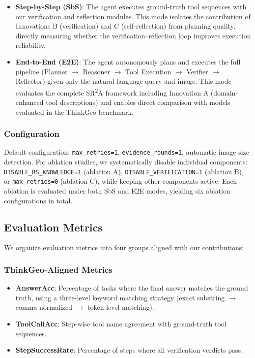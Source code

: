 \documentclass[journal]{IEEEtran}
\begin{document}
\begin{itemize}[leftmargin=*]
    \item \textbf{Step-by-Step (SbS)}: The agent executes ground-truth tool sequences with our verification and reflection modules. This mode isolates the contribution of Innovations B (verification) and C (self-reflection) from planning quality, directly measuring whether the verification--reflection loop improves execution reliability.
    \item \textbf{End-to-End (E2E)}: The agent autonomously plans and executes the full pipeline (Planner $\rightarrow$ Reasoner $\rightarrow$ Tool Execution $\rightarrow$ Verifier $\rightarrow$ Reflector) given only the natural language query and image. This mode evaluates the complete SR\textsuperscript{2}A framework including Innovation A (domain-enhanced tool descriptions) and enables direct comparison with models evaluated in the ThinkGeo benchmark.
\end{itemize}

\subsubsection{Configuration}
Default configuration: \texttt{max\_retries=1}, \texttt{evidence\_rounds=1}, automatic image size detection.
For ablation studies, we systematically disable individual components: \texttt{DISABLE\_RS\_KNOWLEDGE=1} (ablation A), \texttt{DISABLE\_VERIFICATION=1} (ablation B), or \texttt{max\_retries=0} (ablation C), while keeping other components active.
Each ablation is evaluated under both SbS and E2E modes, yielding six ablation configurations in total.

\subsection{Evaluation Metrics}
\label{subsec:metrics}

We organize evaluation metrics into four groups aligned with our contributions:

\subsubsection{ThinkGeo-Aligned Metrics}
\begin{itemize}[leftmargin=*]
    \item \textbf{AnswerAcc}: Percentage of tasks where the final answer matches the ground truth, using a three-level keyword matching strategy (exact substring $\rightarrow$ comma-normalized $\rightarrow$ token-level matching).
    \item \textbf{ToolCallAcc}: Step-wise tool name agreement with ground-truth tool sequences.
    \item \textbf{StepSuccessRate}: Percentage of steps where all verification verdicts pass.
\end{itemize}
\end{document}
